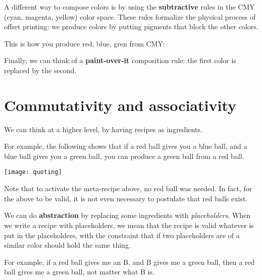 A different way to compose colors is by using the \textbf{subtractive} rules in the CMY (cyan, magenta, yellow) color space.
These rules formalize the physical process of offset printing: we produce colors by putting pigments that block the other colors.


\begin{center}
\end{center}

This is how you produce red, blue, gren from CMY:


\begin{center}
  \end{center}

Finally, we can think of a \textbf{paint-over-it} composition rule: the first color is replaced by the second.

\begin{center}
\end{center}

\section{Commutativity and associativity}

We can think at a higher level, by having recipes as ingredients.

For example, the following shows that if a red ball gives you a blue ball, and a blue ball gives you a green ball, you can produce a green ball from a red ball.


\begin{center}
\texttt{[image: quoting]}
\end{center}

Note that to activate the meta-recipe above, no red ball was needed.
In fact, for the above to be valid, it is not even necessary to postulate that red balls exist.

We can do \textbf{abstraction} by replacing some ingredients with \emph{placeholders}.
When we write a recipe with placeholders, we mean that the recipe is valid whatever is put in the placeholders, with the constraint that if two placeholders are of a similar color should hold the same thing.

For example, if a red ball gives me an B, and B gives me a green ball, then a red ball gives me a green ball, not matter what B is.

